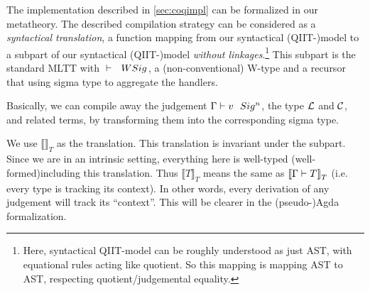 The implementation described in \cref{sec:coqimpl} can be formalized in our metatheory. The described compilation strategy can be considered as a \textit{syntactical translation}, a function mapping from our syntactical (QIIT-)model to a subpart of our syntactical (QIIT-)model \textit{without linkages}.\footnote{Here, syntactical QIIT-model can be roughly understood as just AST, with equational rules acting like quotient. So this mapping is mapping AST to AST, respecting quotient/judgemental equality.} This subpart is the standard MLTT with ${ {} \vdash {} \ \ WSig^{} }$, a (non-conventional) W-type and a recursor that using sigma type to aggregate the handlers. 

Basically, we can compile away the judgement ${ {\Gamma} \vdash {v} \ \ Sig^{n} }$, the type ${\mathcal{L}}$ and ${\mathcal{C}}$, and related terms, by transforming them into the corresponding sigma type.

 

\newcommand{\denotesT}[1]{{{\llbracket {#1} \rrbracket}_T}}
\newcommand{\Sigr}[2]{{ "Sig"^r~{#1}~{#2} }}

We use $\denotesT{}$ as the translation. This translation is invariant under the subpart. Since we are in an intrinsic setting, everything here is well-typed (well-formed)including this translation. Thus $\denotesT{T}$ means the same as $\denotesT{\goodType{\Gamma}{T}{}}$ (i.e. every type is tracking its context). In other words, every derivation of any judgement will track its ``context''. This will be clearer in the (pseudo-)Agda formalization.

